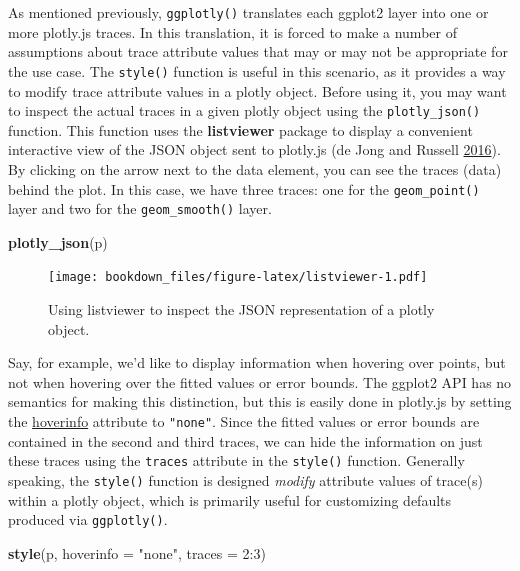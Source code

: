 \documentclass[12pt,]{isuthesis}
\newenvironment{Shaded}{\begin{snugshade}}{\end{snugshade}}
\newcommand{\KeywordTok}[1]{\textcolor[rgb]{0.13,0.29,0.53}{\textbf{{#1}}}}
\newcommand{\DataTypeTok}[1]{\textcolor[rgb]{0.13,0.29,0.53}{{#1}}}
\newcommand{\DecValTok}[1]{\textcolor[rgb]{0.00,0.00,0.81}{{#1}}}
\newcommand{\StringTok}[1]{\textcolor[rgb]{0.31,0.60,0.02}{{#1}}}
\newcommand{\NormalTok}[1]{{#1}}
\begin{document}
As mentioned previously, \texttt{ggplotly()} translates each ggplot2
layer into one or more plotly.js traces. In this translation, it is
forced to make a number of assumptions about trace attribute values that
may or may not be appropriate for the use case. The \texttt{style()}
function is useful in this scenario, as it provides a way to modify
trace attribute values in a plotly object. Before using it, you may want
to inspect the actual traces in a given plotly object using the
\texttt{plotly\_json()} function. This function uses the
\textbf{listviewer} package to display a convenient interactive view of
the JSON object sent to plotly.js (de Jong and Russell
\protect\hyperlink{ref-listviewer}{2016}). By clicking on the arrow next
to the data element, you can see the traces (data) behind the plot. In
this case, we have three traces: one for the \texttt{geom\_point()}
layer and two for the \texttt{geom\_smooth()} layer.

\begin{Shaded}
\begin{Highlighting}[]
\KeywordTok{plotly_json}\NormalTok{(p)}
\end{Highlighting}
\end{Shaded}

\begin{figure}
\centering
\texttt{[image: bookdown\_files/figure-latex/listviewer-1.pdf]}
\caption{\label{fig:listviewer}Using listviewer to inspect the JSON
representation of a plotly object.}
\end{figure}

Say, for example, we'd like to display information when hovering over
points, but not when hovering over the fitted values or error bounds.
The ggplot2 API has no semantics for making this distinction, but this
is easily done in plotly.js by setting the
\href{https://plot.ly/r/reference/\#scatter-hoverinfo}{hoverinfo}
attribute to \texttt{"none"}. Since the fitted values or error bounds
are contained in the second and third traces, we can hide the
information on just these traces using the \texttt{traces} attribute in
the \texttt{style()} function. Generally speaking, the \texttt{style()}
function is designed \emph{modify} attribute values of trace(s) within a
plotly object, which is primarily useful for customizing defaults
produced via \texttt{ggplotly()}.

\begin{Shaded}
\begin{Highlighting}[]
\KeywordTok{style}\NormalTok{(p, }\DataTypeTok{hoverinfo =} \StringTok{"none"}\NormalTok{, }\DataTypeTok{traces =} \DecValTok{2}\NormalTok{:}\DecValTok{3}\NormalTok{)}
\end{Highlighting}
\end{Shaded}
\end{document}
